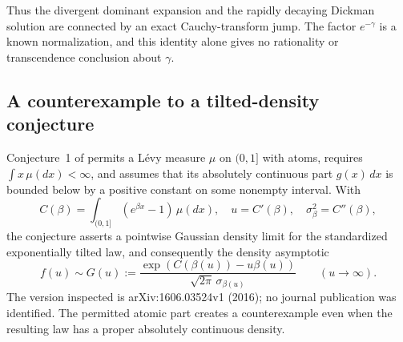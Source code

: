 \documentclass[11pt,a4paper]{article}
\theoremstyle{definition}
\theoremstyle{remark}
\numberwithin{equation}{section}
\begin{document}
Thus the divergent dominant expansion and the rapidly decaying Dickman
solution are connected by an exact Cauchy-transform jump. The factor
$e^{-\gamma}$ is a known normalization, and this identity alone gives
no rationality or transcendence conclusion about $\gamma$.

\subsection{A counterexample to a tilted-density conjecture}

Conjecture~1 of \cite[Section~7, p.~29]{p8:ArratiaKochmanZabell2016} permits a
L\'evy measure $\mu$ on $(0,1]$ with atoms, requires
$\int x\,\mu(dx)<\infty$, and assumes that its absolutely continuous part
$g(x)\,dx$ is bounded below by a positive constant on some nonempty
interval. With
\[
 C(\beta)=\int_{(0,1]}(e^{\beta x}-1)\,\mu(dx),\quad
 u=C'(\beta),\quad \sigma_\beta^2=C''(\beta),
\]
the conjecture asserts a pointwise Gaussian density limit for the
standardized exponentially tilted law, and consequently the density
asymptotic
\begin{equation}\label{p8:pf:conjectured}
 f(u)\sim G(u):=\frac{\exp(C(\beta(u))-u\beta(u))}
                    {\sqrt{2\pi}\,\sigma_{\beta(u)}}
 \qquad(u\longrightarrow\infty).
\end{equation}
The version inspected is arXiv:1606.03524v1 (2016); no journal publication
was identified. The permitted atomic part creates a counterexample even
when the resulting law has a proper absolutely continuous density.
\end{document}

